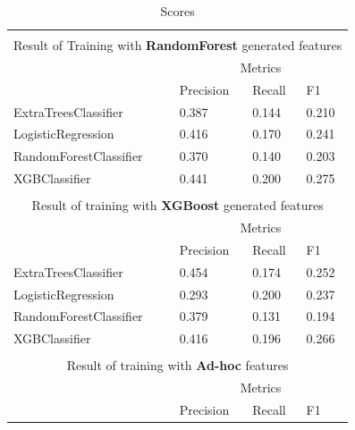 \documentclass[twoside,openright,titlepage,numbers=noenddot,headinclude,%
               footinclude=true,cleardoublepage=empty,abstractoff,BCOR=5mm,%
               paper=a4,fontsize=11pt,ngerman,american]{scrreprt}
\numberwithin{theorem}{chapter}
\numberwithin{definition}{chapter}
\numberwithin{algorithm}{chapter}
\numberwithin{figure}{chapter}
\numberwithin{table}{chapter}
\numberwithin{equation}{chapter}
\begin{document}
\setlength{\extrarowheight}{1.5pt}
\begin{table}[!htbp]
\caption{Scores} %
\centering %
\begin{tabular}{|p{6cm}|p{1.5cm}|p{1.5cm}|p{1.5cm}|} %
\hline %
\multicolumn{4}{|c|}{}\\
\multicolumn{4}{|c|}{Result of Training with \textbf{RandomForest} generated features}\\[5pt]
\hline 
& \multicolumn{3}{c|}{Metrics}\\[5pt]
\cline{2-4} 
& Precision & Recall & F1\\[0.5ex]
\hline %

ExtraTreesClassifier     &  0.387       &  0.144     &  0.210     \\ 
LogisticRegression       &  0.416       &  0.170     &  0.241     \\ 
RandomForestClassifier   &  0.370       &  0.140     &  0.203     \\ 
XGBClassifier            &  0.441       &  0.200     &  0.275     \\ 


\hline%

\multicolumn{4}{|c|}{}\\
\multicolumn{4}{|c|}{Result of training with \textbf{XGBoost} generated features}\\[5pt]
\hline 
& \multicolumn{3}{c|}{Metrics}\\[5pt]
\cline{2-4} 
& Precision & Recall & F1\\[0.5ex]
\hline %

ExtraTreesClassifier     & 0.454       & 0.174     & 0.252\\     
LogisticRegression       & 0.293       & 0.200     & 0.237\\     
RandomForestClassifier   & 0.379       & 0.131     & 0.194\\     
XGBClassifier            & 0.416       & 0.196     & 0.266\\

\hline%

\multicolumn{4}{|c|}{}\\
\multicolumn{4}{|c|}{Result of training with \textbf{Ad-hoc} features}\\[5pt]
\hline 
& \multicolumn{3}{c|}{Metrics}\\[5pt]
\cline{2-4} 
& Precision & Recall & F1\\[0.5ex]
\hline %


\end{tabular}
\end{table}
\end{document}
